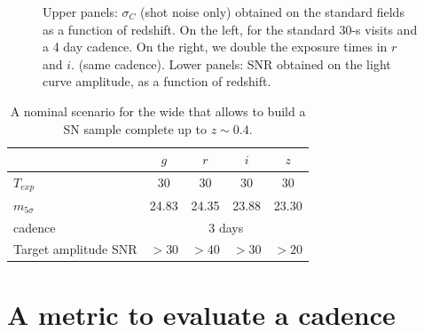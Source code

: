 \documentclass[\docopts]{\docclass}
\begin{document}
\begin{figure}
\begin{center}
\end{center}
\caption{Upper panels: $\sigma_C$ (shot noise only) obtained on the
  standard fields as a function of redshift.  On the left, for the
  standard 30-s visits and a 4 day cadence. On the right, we double
  the exposure times in $r$ and $i$.  (same cadence).  Lower panels:
  SNR obtained on the light curve amplitude, as a function of
  redshift.}
\label{fig:sigc_vs_z_4_day_cadence_wide}
\end{figure}


\begin{table}
\begin{center}
\caption{A nominal scenario for the wide that allows to build a SN
  sample complete up to $z \sim 0.4$.}
\label{tab:nominal_scenario_DDF}
\begin{tabular}{l|cccc}
\hline
\hline
              & $g$ & $r$ & $i$ & $z$ \\
\hline 
$T_{exp}$      & 30       &   30    &  30        & 30       \\
$m_{5\sigma}$  &  24.83   &  24.35   &  23.88    &  23.30   \\
cadence       &  \multicolumn{4}{c}{3 days} \\
Target amplitude SNR & $>30$ & $>40$ & $>30$ & $>20$ \\
\hline
\end{tabular}
\end{center}
\end{table}






\section{A metric to evaluate a cadence}
\label{sec:metric}
\end{document}
